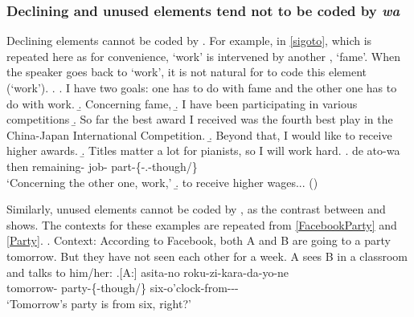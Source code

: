 \subsubsection{Declining and unused elements tend not to be coded by \textit{wa}}\label{Par:Wa:DecUnusedWa}

Declining elements cannot be coded by .
For example, in \ref{sigoto}, which is repeated here as \Next for convenience,
`work' is intervened by another , `fame'.
When the speaker goes back to `work',
it is not natural for  to code this element (`work').
\ex.
 \a. I have two goals: one has to do with fame and the other one has to do with work.
 \b. Concerning fame,
 \b. I have been participating in various  competitions
 \b. So far the best award I received was the fourth best play in the China-Japan International Competition.
 \b. Beyond that, I would like to receive higher awards.
 \b. Titles matter a lot for pianists, so I will work hard.
 \bg. de ato-wa   \\
 	then remaining- job- part-\{-.-though/\} \\
	`Concerning the other one, work,'
 \b. to receive higher wages...
\hfill{()}
%

Similarly,
unused elements cannot be coded by ,
as the contrast between \Next and \NNext shows.
The contexts for these examples are repeated from \ref{FacebookParty} and \ref{Party}.
%
\ex. Context: According to Facebook, both A and B are going to a party tomorrow. But they have not seen each other for a week. A sees B in a classroom and talks to him/her:
	\a.[A:] asita-no  roku-zi-kara-da-yo-ne \\
		tomorrow- party-\{-though/\} six-o'clock-from--\ab{fp}- \\
		`Tomorrow's party is from six, right?' 

